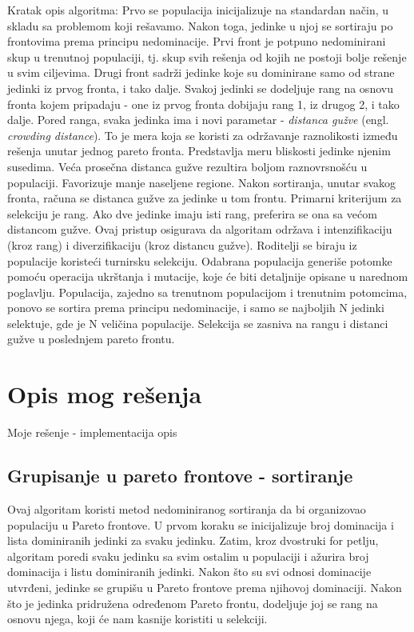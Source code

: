 \documentclass[12pt]{article}
\begin{document}
Kratak opis algoritma:
Prvo se populacija inicijalizuje na standardan način, u skladu sa problemom koji rešavamo. Nakon toga, jedinke u njoj se sortiraju po frontovima prema principu nedominacije. Prvi front je potpuno nedominirani skup u trenutnoj populaciji, tj. skup svih rešenja od kojih ne postoji bolje rešenje u svim ciljevima. Drugi front sadrži jedinke koje su dominirane samo od strane jedinki iz prvog fronta, i tako dalje. Svakoj jedinki se dodeljuje rang na osnovu fronta kojem pripadaju - one iz prvog fronta dobijaju rang 1, iz drugog 2, i tako dalje.
Pored ranga, svaka jedinka ima i novi parametar - \textit{distanca gužve} (engl. \textit{crowding distance}). To je mera koja se koristi za održavanje raznolikosti između rešenja unutar jednog pareto fronta. Predstavlja meru bliskosti jedinke njenim susedima. Veća prosečna distanca gužve rezultira boljom raznovrsnošću u populaciji. Favorizuje manje naseljene regione. Nakon sortiranja, unutar svakog fronta, računa se distanca gužve za jedinke u tom frontu.
Primarni kriterijum za selekciju je rang. Ako dve jedinke imaju isti rang, preferira se ona sa većom distancom gužve.
Ovaj pristup osigurava da algoritam održava i intenzifikaciju (kroz rang) i diverzifikaciju (kroz distancu gužve).
Roditelji se biraju iz populacije koristeći turnirsku selekciju. Odabrana populacija generiše potomke pomoću operacija ukrštanja i mutacije, koje će biti detaljnije opisane u narednom poglavlju.
Populacija, zajedno sa trenutnom populacijom i trenutnim potomcima, ponovo se sortira prema principu nedominacije, i samo se najboljih N jedinki selektuje, gde je N veličina populacije. Selekcija se zasniva na rangu i distanci gužve u poslednjem pareto frontu.

\section{Opis mog rešenja}
Moje rešenje - implementacija
opis 
\subsection{Grupisanje u pareto frontove - sortiranje}
Ovaj algoritam koristi metod nedominiranog sortiranja da bi organizovao populaciju u Pareto frontove. U prvom koraku se inicijalizuje broj dominacija i lista dominiranih jedinki za svaku jedinku. Zatim, kroz dvostruki for petlju, algoritam poredi svaku jedinku sa svim ostalim u populaciji i ažurira broj dominacija i listu dominiranih jedinki. Nakon što su svi odnosi dominacije utvrđeni, jedinke se grupišu u Pareto frontove prema njihovoj dominaciji. Nakon što je jedinka pridružena određenom Pareto frontu, dodeljuje joj se rang na osnovu njega, koji će nam kasnije koristiti u selekciji.
\end{document}
